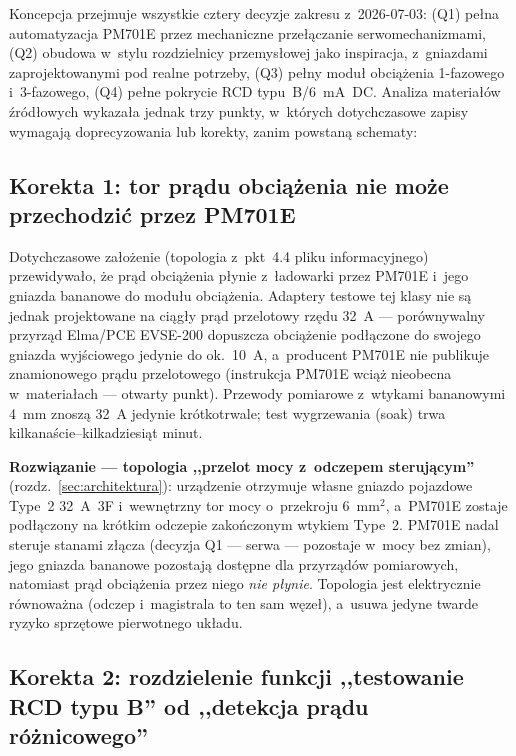 \documentclass[11pt,a4paper]{article}
\begin{document}
Koncepcja przejmuje wszystkie cztery decyzje zakresu z~2026-07-03: (Q1) pełna automatyzacja PM701E przez mechaniczne przełączanie serwomechanizmami, (Q2) obudowa w~stylu rozdzielnicy przemysłowej jako inspiracja, z~gniazdami zaprojektowanymi pod realne potrzeby, (Q3) pełny moduł obciążenia 1-fazowego i~3-fazowego, (Q4) pełne pokrycie RCD typu~B/6~mA~DC. Analiza materiałów źródłowych wykazała jednak trzy punkty, w~których dotychczasowe zapisy wymagają doprecyzowania lub korekty, zanim powstaną schematy:

\subsection{Korekta 1: tor prądu obciążenia nie może przechodzić przez PM701E}
\label{sec:korekta1}

Dotychczasowe założenie (topologia z~pkt~4.4 pliku informacyjnego) przewidywało, że prąd obciążenia płynie z~ładowarki przez PM701E i~jego gniazda bananowe do modułu obciążenia. Adaptery testowe tej klasy nie są jednak projektowane na ciągły prąd przelotowy rzędu 32~A --- porównywalny przyrząd Elma/PCE EVSE-200 dopuszcza obciążenie podłączone do swojego gniazda wyjściowego jedynie do ok.~10~A, a~producent PM701E nie publikuje znamionowego prądu przelotowego (instrukcja PM701E wciąż nieobecna w~materiałach --- otwarty punkt). Przewody pomiarowe z~wtykami bananowymi 4~mm znoszą 32~A jedynie krótkotrwale; test wygrzewania (soak) trwa kilkanaście--kilkadziesiąt minut.

\textbf{Rozwiązanie --- topologia ,,przelot mocy z~odczepem sterującym''} (rozdz.~\ref{sec:architektura}): urządzenie otrzymuje własne gniazdo pojazdowe Type~2 32~A~3F i~wewnętrzny tor mocy o~przekroju 6~mm$^2$, a~PM701E zostaje podłączony na krótkim odczepie zakończonym wtykiem Type~2. PM701E nadal steruje stanami złącza (decyzja Q1 --- serwa --- pozostaje w~mocy bez zmian), jego gniazda bananowe pozostają dostępne dla przyrządów pomiarowych, natomiast prąd obciążenia przez niego \emph{nie płynie}. Topologia jest elektrycznie równoważna (odczep i~magistrala to ten sam węzeł), a~usuwa jedyne twarde ryzyko sprzętowe pierwotnego układu.

\subsection{Korekta 2: rozdzielenie funkcji ,,testowanie RCD typu B'' od ,,detekcja prądu różnicowego''}
\label{sec:korekta2}
\end{document}
